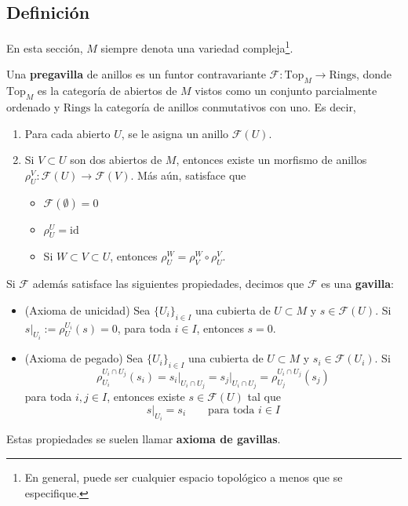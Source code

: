 \subsection{Definición}

En esta sección, $M$ siempre denota una variedad compleja\footnote{En general, puede ser cualquier espacio topológico a menos que se especifique.}. 
\begin{definition}
	Una \textbf{pregavilla} de anillos es un funtor contravariante $\mathscr{F}:\mathrm{Top}_M\longrightarrow \mathrm{Rings}$, donde $\mathrm{Top}_M$ es la categoría de abiertos de $M$ vistos como un conjunto parcialmente ordenado y $\mathrm{Rings}$ la categoría de anillos conmutativos con uno. Es decir,
	\begin{enumerate}
		\item Para cada abierto $U$, se le asigna un anillo $\mathscr{F}(U)$.
		\item Si $V\subset U$ son dos abiertos de $M$, entonces existe un morfismo de anillos $\rho_{U}^V:\mathscr{F}(U)\to \mathscr{F}(V)$. Más aún, satisface que
		\begin{itemize}
			\item $\mathscr{F}(\emptyset)=0$
			\item $\rho_{U}^{U}=\mathrm{id}$
			\item Si $W\subset V \subset U$, entonces $\rho_U^W=\rho_V^W\circ \rho_U^V$.
		\end{itemize}
		
	\end{enumerate}
	Si $\mathscr{F}$ además satisface las siguientes propiedades, decimos que $\mathscr{F}$ es una \textbf{gavilla}:
	\begin{itemize}
		\item [1)] (Axioma de unicidad) Sea $\{U_i\}_{i\in I}$ una cubierta de $U\subset M$ y $s\in\mathscr{F}(U)$. Si $s\left.\right|_{U_i}:=\rho_U^{U_i}(s)=0$, para toda $i\in I$, entonces $s=0$.
		\item [2)] (Axioma de pegado) Sea $\{U_i\}_{i\in I}$ una cubierta de $U\subset M$ y $s_i\in\mathscr{F}(U_i)$. Si
		\begin{equation*}
			\rho_{U_i}^{U_i\cap U_j}(s_i)=s_i\left.\right|_{U_i\cap U_j}= s_j\left.\right|_{U_i\cap U_j}=\rho_{U_j}^{U_i\cap U_j}(s_j)
		\end{equation*}
		para toda $i,j\in I$, entonces existe $s\in \mathscr{F}(U)$ tal que 
		\begin{equation*}
			s\left.\right|_{U_i}=s_i\qquad \text{para toda }i\in I
		\end{equation*}
	\end{itemize}
	Estas propiedades se suelen llamar \textbf{axioma de gavillas}.
\end{definition}

